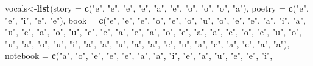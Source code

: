 \documentclass[
]{article}
\newenvironment{Shaded}{\begin{snugshade}}{\end{snugshade}}
\newcommand{\DataTypeTok}[1]{\textcolor[rgb]{0.13,0.29,0.53}{#1}}
\newcommand{\KeywordTok}[1]{\textcolor[rgb]{0.13,0.29,0.53}{\textbf{#1}}}
\newcommand{\NormalTok}[1]{#1}
\newcommand{\StringTok}[1]{\textcolor[rgb]{0.31,0.60,0.02}{#1}}
\begin{document}
\begin{Shaded}
\begin{Highlighting}[]
\NormalTok{vocals<-}\KeywordTok{list}\NormalTok{(}\DataTypeTok{story =} \KeywordTok{c}\NormalTok{(}\StringTok{"e"}\NormalTok{, }\StringTok{"e"}\NormalTok{, }\StringTok{"e"}\NormalTok{, }\StringTok{"e"}\NormalTok{, }\StringTok{"a"}\NormalTok{, }\StringTok{"e"}\NormalTok{, }\StringTok{"o"}\NormalTok{, }
\StringTok{"o"}\NormalTok{, }\StringTok{"o"}\NormalTok{, }\StringTok{"a"}\NormalTok{), }\DataTypeTok{poetry =} \KeywordTok{c}\NormalTok{(}\StringTok{"e"}\NormalTok{, }\StringTok{"e"}\NormalTok{, }\StringTok{"i"}\NormalTok{, }\StringTok{"e"}\NormalTok{, }\StringTok{"e"}\NormalTok{), }\DataTypeTok{book =} \KeywordTok{c}\NormalTok{(}\StringTok{"e"}\NormalTok{, }
\StringTok{"e"}\NormalTok{, }\StringTok{"e"}\NormalTok{, }\StringTok{"o"}\NormalTok{, }\StringTok{"e"}\NormalTok{, }\StringTok{"o"}\NormalTok{, }\StringTok{"u"}\NormalTok{, }\StringTok{"o"}\NormalTok{, }\StringTok{"e"}\NormalTok{, }\StringTok{"e"}\NormalTok{, }\StringTok{"a"}\NormalTok{, }\StringTok{"i"}\NormalTok{, }\StringTok{"a"}\NormalTok{, }\StringTok{"u"}\NormalTok{, }
\StringTok{"e"}\NormalTok{, }\StringTok{"a"}\NormalTok{, }\StringTok{"o"}\NormalTok{, }\StringTok{"u"}\NormalTok{, }\StringTok{"e"}\NormalTok{, }\StringTok{"e"}\NormalTok{, }\StringTok{"a"}\NormalTok{, }\StringTok{"e"}\NormalTok{, }\StringTok{"a"}\NormalTok{, }\StringTok{"o"}\NormalTok{, }\StringTok{"e"}\NormalTok{, }\StringTok{"a"}\NormalTok{, }\StringTok{"a"}\NormalTok{, }
\StringTok{"e"}\NormalTok{, }\StringTok{"o"}\NormalTok{, }\StringTok{"e"}\NormalTok{, }\StringTok{"u"}\NormalTok{, }\StringTok{"o"}\NormalTok{, }\StringTok{"u"}\NormalTok{, }\StringTok{"a"}\NormalTok{, }\StringTok{"o"}\NormalTok{, }\StringTok{"u"}\NormalTok{, }\StringTok{"i"}\NormalTok{, }\StringTok{"a"}\NormalTok{, }\StringTok{"a"}\NormalTok{, }\StringTok{"u"}\NormalTok{, }
\StringTok{"a"}\NormalTok{, }\StringTok{"a"}\NormalTok{, }\StringTok{"e"}\NormalTok{, }\StringTok{"u"}\NormalTok{, }\StringTok{"a"}\NormalTok{, }\StringTok{"e"}\NormalTok{, }\StringTok{"a"}\NormalTok{, }\StringTok{"e"}\NormalTok{, }\StringTok{"a"}\NormalTok{, }\StringTok{"a"}\NormalTok{), }\DataTypeTok{notebook =} \KeywordTok{c}\NormalTok{(}\StringTok{"a"}\NormalTok{, }
\StringTok{"o"}\NormalTok{, }\StringTok{"e"}\NormalTok{, }\StringTok{"e"}\NormalTok{, }\StringTok{"e"}\NormalTok{, }\StringTok{"a"}\NormalTok{, }\StringTok{"a"}\NormalTok{, }\StringTok{"i"}\NormalTok{, }\StringTok{"e"}\NormalTok{, }\StringTok{"a"}\NormalTok{, }\StringTok{"u"}\NormalTok{, }\StringTok{"e"}\NormalTok{, }\StringTok{"e"}\NormalTok{, }\StringTok{"i"}\NormalTok{, }

\end{Highlighting}
\end{Shaded}
\end{document}
